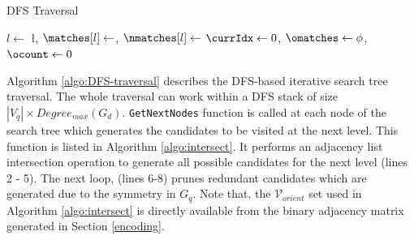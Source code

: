 \begin{algorithm}
    \caption{DFS Traversal}
    \label{algo:DFS-traversal}
    \small



    $l \leftarrow $ \l, $\matches[l] \leftarrow $\imatches, $\nmatches[l] \leftarrow $\isize\;
    $ \currIdx \leftarrow 0$, $\omatches \leftarrow \phi $, $\ocount \leftarrow 0$  \;
\end{algorithm}

Algorithm \ref{algo:DFS-traversal} describes the DFS-based iterative search tree traversal.
The whole traversal can work within a DFS stack of size $|V_q|\times Degree_{max}(G_d)$.
\texttt{GetNextNodes} function is called at each node of the search tree which generates the candidates to be visited at the next level.
This function is listed in Algorithm \ref{algo:intersect}.
It performs an adjacency list intersection operation to generate all possible candidates for the next level (lines 2 - 5).
The next loop, (lines 6-8) prunes redundant candidates which are generated due to the symmetry in $G_q$.
Note that, the $\mathcal{V}_{orient}$ set used in Algorithm \ref{algo:intersect} is directly available from the binary adjacency matrix generated in Section \ref{encoding}.

